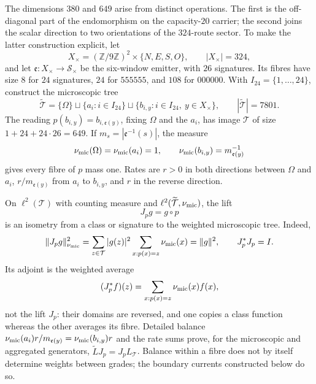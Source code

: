 The dimensions $380$ and $649$ arise from distinct operations. The first is
the off-diagonal part of the endomorphism on the capacity-$20$ carrier; the
second joins the scalar direction to two orientations of the $324$-route
sector. To make the latter construction explicit, let
\[
 X_\times=(\mathbb Z/9\mathbb Z)^2\times\{N,E,S,O\},
 \qquad |X_\times|=324,
\]
and let $\mathfrak e:X_\times\to\mathcal S_\times$ be the six-window
emitter, with $26$ signatures. Its fibres have size $8$ for $24$ signatures,
$24$ for $555555$, and $108$ for $000000$. With
$I_{24}=\{1,\ldots,24\}$, construct the microscopic tree
\begin{equation}
 \widetilde{\mathcal T}=\{\Omega\}\sqcup\{a_i:i\in I_{24}\}
 \sqcup\{b_{i,y}:i\in I_{24},\ y\in X_\times\},
 \qquad |\widetilde{\mathcal T}|=7801.
 \label{v:eq:arbol-microscopico-7801}
\end{equation}
The reading $p(b_{i,y})=b_{i,\mathfrak e(y)}$, fixing $\Omega$ and the
$a_i$, has image $\mathcal T$ of size
$1+24+24\cdot26=649$. If
$m_s=|\mathfrak e^{-1}(s)|$, the measure
\begin{equation}
 \nu_{\rm mic}(\Omega)=\nu_{\rm mic}(a_i)=1,
 \qquad \nu_{\rm mic}(b_{i,y})=m_{\mathfrak e(y)}^{-1}
 \label{v:eq:medida-arbol-microscopico}
\end{equation}
gives every fibre of $p$ mass one. Rates are $r>0$ in both directions
between $\Omega$ and $a_i$, $r/m_{\mathfrak e(y)}$ from $a_i$ to
$b_{i,y}$, and $r$ in the reverse direction.

On $\ell^2(\mathcal T)$ with counting measure and
$\ell^2(\widetilde{\mathcal T},\nu_{\rm mic})$, the lift
\begin{equation}
 J_p g=g\circ p
 \label{v:eq:levantamiento-fibras-Jp}
\end{equation}
is an isometry from a class or signature to the weighted microscopic tree.
Indeed,
\[
 \|J_pg\|_{\nu_{\rm mic}}^2
 =\sum_{z\in\mathcal T}|g(z)|^2
   \sum_{x:p(x)=z}\nu_{\rm mic}(x)=\|g\|^2,
 \qquad J_p^*J_p=I.
\]
Its adjoint is the weighted average
\begin{equation}
 (J_p^*f)(z)=\sum_{x:p(x)=z}\nu_{\rm mic}(x)f(x),
 \label{v:eq:adjunto-fibras-Jp}
\end{equation}
not the lift $J_p$: their domains are reversed, and one copies a class
function whereas the other averages its fibre. Detailed balance
$\nu_{\rm mic}(a_i)r/m_{\mathfrak e(y)}
=\nu_{\rm mic}(b_{i,y})r$ and the rate sums prove, for the microscopic
and aggregated generators,
$\widetilde L J_p=J_pL_{\mathcal T}$. Balance within a fibre does not by
itself determine weights between grades; the boundary currents constructed
below do so.

